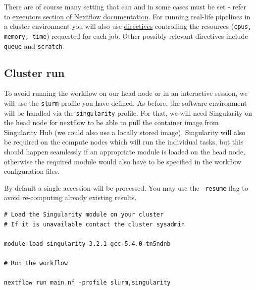 

There are of course many setting that can and in some cases must be set - refer to \href{https://www.nextflow.io/docs/latest/executor.html}{executors section of Nextflow documentation}. 
For running real-life pipelines in a cluster environment you will also use \href{https://www.nextflow.io/docs/latest/process.html#directives}{directives} controlling the resources (\texttt{cpus, memory, time}) requested for each job. Other possibly relevant directives include \texttt{queue} and \texttt{scratch}.



\subsection{Cluster run}


To avoid running the workflow on our head node or in an interactive session, we will use the \texttt{slurm} profile you have defined.
As before, the software environment will be handled via the \texttt{singularity} profile. 
For that, we will need Singularity on the head node for nextflow to be able to pull the container image from Singularity Hub (we could also use a locally stored image). Singularity will also be required on the compute nodes which will run the individual tasks, but this should happen seamlessly if an appropriate module is loaded on the head node, otherwise the required module would also have to be specified in the workflow configuration files. 

\begin{steps}
By default a single accession will be processed. 
You may use the \texttt{-resume} flag to avoid re-computing already existing results. 


\begin{lstlisting}
# Load the Singularity module on your cluster
# If it is unavailable contact the cluster sysadmin

module load singularity-3.2.1-gcc-5.4.0-tn5ndnb

# Run the workflow

nextflow run main.nf -profile slurm,singularity
\end{lstlisting}
\end{steps}




